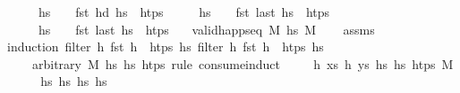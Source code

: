 \begin{isabellebody}
\ \ \ \ \ {\isachardoublequoteopen}hs{\isacharprime}{\kern0pt}\ {\isasymnoteq}\ {\isacharbrackleft}{\kern0pt}{\isacharbrackright}{\kern0pt}\ {\isasymLongrightarrow}\ {\isacharparenleft}{\kern0pt}fst\ {\isacharparenleft}{\kern0pt}hd\ hs{\isacharprime}{\kern0pt}{\isacharparenright}{\kern0pt}{\isacharparenright}{\kern0pt}\ {\isasymin}\ htps{\isachardoublequoteclose}\isanewline
\ \ \ \ \ {\isachardoublequoteopen}hs\ {\isasymnoteq}\ {\isacharbrackleft}{\kern0pt}{\isacharbrackright}{\kern0pt}\ {\isasymLongrightarrow}\ {\isacharparenleft}{\kern0pt}fst\ {\isacharparenleft}{\kern0pt}last\ hs{\isacharparenright}{\kern0pt}{\isacharparenright}{\kern0pt}\ {\isasymin}\ htps{\isachardoublequoteclose}\isanewline
\ \ \ \ \ {\isachardoublequoteopen}hs{\isacharprime}{\kern0pt}\ {\isasymnoteq}\ {\isacharbrackleft}{\kern0pt}{\isacharbrackright}{\kern0pt}\ {\isasymLongrightarrow}\ {\isacharparenleft}{\kern0pt}fst\ {\isacharparenleft}{\kern0pt}last\ hs{\isacharprime}{\kern0pt}{\isacharparenright}{\kern0pt}{\isacharparenright}{\kern0pt}\ {\isasymin}\ htps{\isachardoublequoteclose}\isanewline
\ \ \ {\isachardoublequoteopen}valid{\isacharunderscore}{\kern0pt}happ{\isacharunderscore}{\kern0pt}seq\ M\ hs{\isacharprime}{\kern0pt}\ M{\isacharprime}{\kern0pt}{\isachardoublequoteclose}\isanewline
%
\isadelimproof
\ \ %
\endisadelimproof
%
\isatagproof
{}\isamarkupfalse%
\ assms\isanewline
{}\isamarkupfalse%
{\isacharparenleft}{\kern0pt}induction\ {\isachardoublequoteopen}filter\ {\isacharparenleft}{\kern0pt}{\isasymlambda}h{\isachardot}{\kern0pt}\ fst\ h\ {\isasymin}\ htps{\isacharparenright}{\kern0pt}\ hs{\isachardoublequoteclose}\ {\isachardoublequoteopen}filter\ {\isacharparenleft}{\kern0pt}{\isasymlambda}h{\isachardot}{\kern0pt}\ fst\ h\ {\isasymin}\ htps{\isacharparenright}{\kern0pt}\ hs{\isacharprime}{\kern0pt}{\isachardoublequoteclose}\isanewline
\ \ \ \ arbitrary{\isacharcolon}{\kern0pt}\ M\ hs\ hs{\isacharprime}{\kern0pt}\ htps\ rule{\isacharcolon}{\kern0pt}\ consume{}{\isachardot}{\kern0pt}induct{\isacharparenright}{\kern0pt}\isanewline
\ \ \isamarkupfalse%
\ {\isacharparenleft}{\kern0pt}{}\ h\ xs\ h{\isacharprime}{\kern0pt}\ ys\ hs\ hs{\isacharprime}{\kern0pt}\ htps\ M{\isacharparenright}{\kern0pt}\isanewline
\ \ \isamarkupfalse%
\ \isamarkupfalse%
\ hs{}\ hs{}\ hs{}{\isacharprime}{\kern0pt}\ hs{}{\isacharprime}{\kern0pt}\isanewline

\end{isabellebody}
